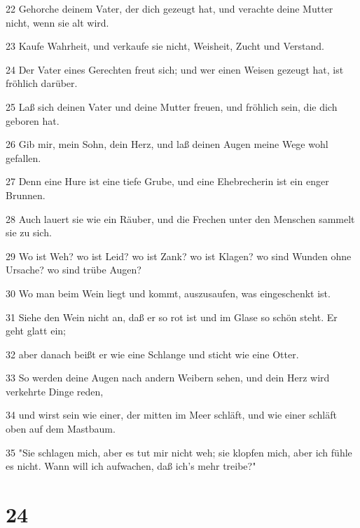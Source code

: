 \par 22 Gehorche deinem Vater, der dich gezeugt hat, und verachte deine Mutter nicht, wenn sie alt wird.
\par 23 Kaufe Wahrheit, und verkaufe sie nicht, Weisheit, Zucht und Verstand.
\par 24 Der Vater eines Gerechten freut sich; und wer einen Weisen gezeugt hat, ist fröhlich darüber.
\par 25 Laß sich deinen Vater und deine Mutter freuen, und fröhlich sein, die dich geboren hat.
\par 26 Gib mir, mein Sohn, dein Herz, und laß deinen Augen meine Wege wohl gefallen.
\par 27 Denn eine Hure ist eine tiefe Grube, und eine Ehebrecherin ist ein enger Brunnen.
\par 28 Auch lauert sie wie ein Räuber, und die Frechen unter den Menschen sammelt sie zu sich.
\par 29 Wo ist Weh? wo ist Leid? wo ist Zank? wo ist Klagen? wo sind Wunden ohne Ursache? wo sind trübe Augen?
\par 30 Wo man beim Wein liegt und kommt, auszusaufen, was eingeschenkt ist.
\par 31 Siehe den Wein nicht an, daß er so rot ist und im Glase so schön steht. Er geht glatt ein;
\par 32 aber danach beißt er wie eine Schlange und sticht wie eine Otter.
\par 33 So werden deine Augen nach andern Weibern sehen, und dein Herz wird verkehrte Dinge reden,
\par 34 und wirst sein wie einer, der mitten im Meer schläft, und wie einer schläft oben auf dem Mastbaum.
\par 35 "Sie schlagen mich, aber es tut mir nicht weh; sie klopfen mich, aber ich fühle es nicht. Wann will ich aufwachen, daß ich's mehr treibe?"

\chapter{24}

